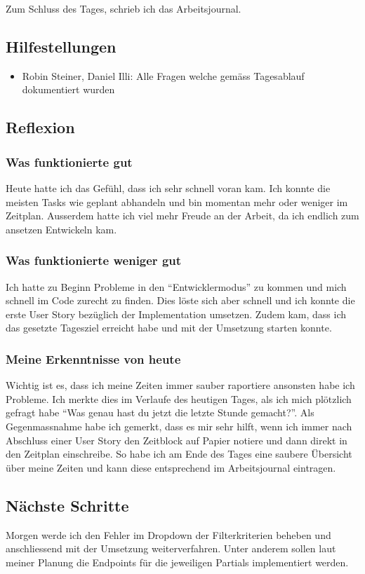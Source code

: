 Zum Schluss des Tages, schrieb ich das Arbeitsjournal.

\subsection*{Hilfestellungen}
\begin{itemize}
    \item Robin Steiner, Daniel Illi: Alle Fragen welche gemäss Tagesablauf dokumentiert wurden
\end{itemize}

\subsection*{Reflexion}

\subsubsection*{Was funktionierte gut}
Heute hatte ich das Gefühl, dass ich sehr schnell voran kam. Ich konnte die meisten Tasks wie geplant abhandeln und bin 
momentan mehr oder weniger im Zeitplan. Ausserdem hatte ich viel mehr Freude an der Arbeit, da ich endlich zum ansetzen Entwickeln kam.

\subsubsection*{Was funktionierte weniger gut}
Ich hatte zu Beginn Probleme in den ``Entwicklermodus'' zu kommen und mich schnell im Code zurecht zu finden.
Dies löste sich aber schnell und ich konnte die erste User Story bezüglich der Implementation umsetzen. Zudem kam, dass ich das 
gesetzte Tagesziel erreicht habe und mit der Umsetzung starten konnte.

\subsubsection*{Meine Erkenntnisse von heute}
Wichtig ist es, dass ich meine Zeiten immer sauber raportiere ansonsten habe ich Probleme. Ich merkte dies im Verlaufe des heutigen Tages, als ich mich plötzlich gefragt habe ``Was genau hast du jetzt die letzte Stunde gemacht?''.
Als Gegenmassnahme habe ich gemerkt, dass es mir sehr hilft,
wenn ich immer nach Abschluss einer User Story den Zeitblock auf Papier notiere und dann direkt in den Zeitplan einschreibe. So habe ich am Ende 
des Tages eine saubere Übersicht über meine Zeiten und kann diese entsprechend im Arbeitsjournal eintragen.

\subsection*{Nächste Schritte}
Morgen werde ich den Fehler im Dropdown der Filterkriterien beheben und anschliessend mit der Umsetzung weiterverfahren. Unter anderem sollen laut
meiner Planung die Endpoints für die jeweiligen Partials implementiert werden.

\pagebreak
